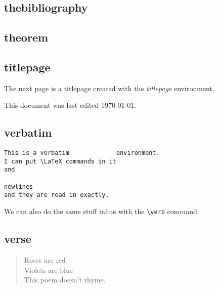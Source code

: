 \documentclass[11pt]{article}
\begin{document}

\subsection{thebibliography}%

\subsection{theorem} %

\subsection{titlepage}
The next page is a titlepage created with the \emph{titlepage} environment.
\begin{titlepage}
    This document was last edited \today.
\end{titlepage}

\subsection{verbatim}%
\begin{verbatim}
This is a verbatim             environment.
I can put \LaTeX commands in it
and

newlines
and they are read in exactly.
\end{verbatim}

We can also do the same stuff inline with the \verb|\verb| command.

\subsection{verse}
\begin{verse}
    Roses are red\\
    Violets are blue\\
    This poem doesn't rhyme.
\end{verse}
\end{document}
